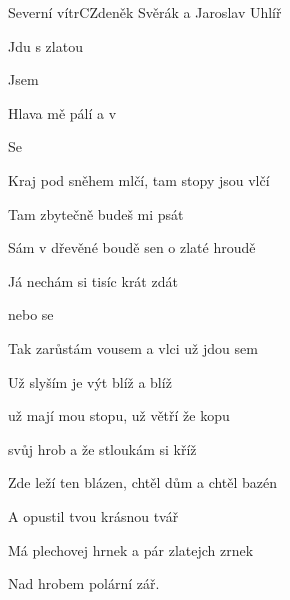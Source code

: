\begin{song}{Severní vítr}{C}{Zdeněk Svěrák a Jaroslav Uhlíř}

\begin{SBVerse}

Jdu s  zlatou

Jsem 

Hlava mě pálí a v 

Se 

\end{SBVerse}

\begin{SBVerse}

Kraj pod sněhem mlčí, tam stopy jsou vlčí

Tam zbytečně budeš mi psát

Sám v dřevěné boudě sen o zlaté hroudě

Já nechám si tisíc krát zdát

\end{SBVerse}

\begin{SBChorus}

 

 nebo se 

\end{SBChorus}

\begin{SBVerse}

Tak zarůstám vousem a vlci už jdou sem

Už slyším je výt blíž a blíž

už mají mou stopu, už větří že kopu

svůj hrob a že stloukám si kříž

\end{SBVerse}

\begin{SBVerse}

Zde leží ten blázen, chtěl dům a chtěl bazén

A opustil tvou krásnou tvář

Má plechovej hrnek a pár zlatejch zrnek

Nad hrobem polární zář.

\end{SBVerse}

\end{song}

\pagebreak